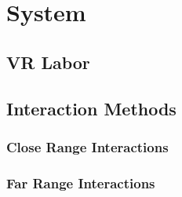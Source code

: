 \section{System}\label{sec:System}

\subsection{VR Labor}\label{sec:VRLabor}

\subsection{Interaction Methods}\label{sec:Interactions}

\subsubsection{Close Range Interactions}\label{sec:CloseRange}

\subsubsection{Far Range Interactions}\label{sec:FarRange}



\newpage